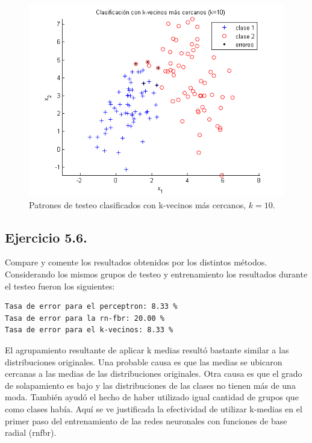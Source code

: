 \documentclass[11pt,a4paper,final]{article}
\begin{document}
\begin{figure}
\includegraphics [width=\textwidth]{Ejercicio5_05.png}
\caption{Patrones de testeo clasificados con k-vecinos más cercanos, $k=10$.}
\label{fig:ejercicio55}
\end{figure}


\subsection{Ejercicio 5.6.}


Compare y comente los resultados obtenidos por los distintos métodos.\\


Considerando los mismos grupos de testeo y entrenamiento los resultados durante el testeo fueron los siguientes:

\begin{verbatim}Tasa de error para el perceptron: 8.33 %
Tasa de error para la rn-fbr: 20.00 %
Tasa de error para el k-vecinos: 8.33 %
\end{verbatim}
    
El agrupamiento resultante de aplicar k medias resultó bastante similar a las distribuciones originales. Una probable causa es que las medias se ubicaron cercanas a las medias de las distribuciones originales. Otra causa es que el grado de solapamiento es bajo y las distribuciones de las clases no tienen más de una moda. También ayudó el hecho de haber utilizado igual cantidad de grupos que como clases había. Aquí se ve justificada la efectividad de utilizar k-medias en el primer paso del entrenamiento de las redes neuronales con funciones de base radial (rnfbr).
\end{document}
